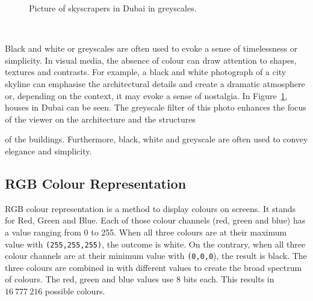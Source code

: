 \documentclass[../MasterThesis.tex]{subfiles}
\begin{document}
\begin{minipage}{0.5\textwidth}
	\begin{figure}[H]
	\begin{center}
		\caption[Picture of skyscrapers in Dubai in greyscales.]{Picture of skyscrapers in Dubai in greyscales.}
		\label{figure:gray}
	\end{center}
\end{figure}\hfill
\end{minipage}\begin{minipage}{0.05\textwidth}
	\ 
\end{minipage}\begin{minipage}{0.45\textwidth}
	Black and white or greyscales are often used to evoke a sense of timelessness or simplicity. In visual media, the absence of colour can draw attention to shapes, textures and contrasts. For example, a black and white photograph of a city skyline can emphasise the architectural details and create a dramatic atmosphere or, depending on the context, it may evoke a sense of nostalgia.
	In Figure~\ref{figure:gray}, houses in Dubai can be seen. The greyscale filter of this photo enhances the focus of the viewer on the architecture and the structures

	
\end{minipage}

\vspace*{-0.2em}
 of the buildings. Furthermore, black, white and greyscale are often used to convey elegance and simplicity.~\cite{colour2}


%





\subsection{RGB Colour Representation}
\label{subsection:RGB}


RGB colour representation is a method to display colours on screens. It stands for Red, Green and Blue. 
Each of those colour channels (red, green and blue) has a value ranging from 0 to 255. When all three colours are at their maximum value with \texttt{(255,255,255)}, the outcome is white. On the contrary, when all three colour channels are at their minimum value with \texttt{(0,0,0}), the result is black.
%
The three colours are combined in with different values to create the broad spectrum of colours. The red, green and blue values use 8 bits each. This results in $16\ 777\ 216$ possible colours.~\cite{colourRGB}
\end{document}
